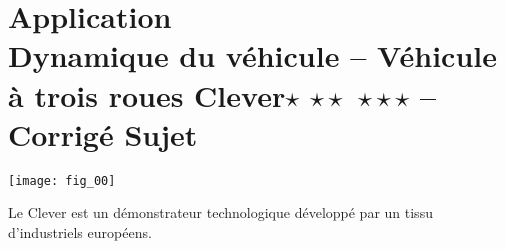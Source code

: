\chapter*{Application  \\ 
Dynamique du véhicule -- Véhicule à trois roues Clever\ifnormal $\star$ \else \fi \ifdifficile $\star\star$ \else \fi \iftdifficile $\star\star\star$ \else \fi 
-- \ifprof Corrigé \else Sujet \fi}

\iflivret {} \else
\ifprof  {} \else \fi
\fi

\setcounter{question}{0}
\begin{marginfigure}
\texttt{[image: fig\_00]}
\end{marginfigure}



Le Clever%
est un démonstrateur technologique développé par un tissu d'industriels européens.%

%

